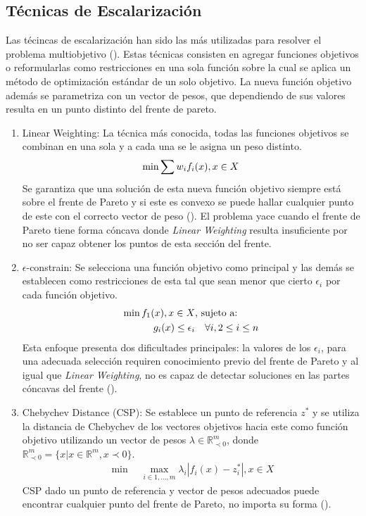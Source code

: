\subsection{T\'ecnicas de Escalarizaci\'on }

Las t\'ecincas de escalarizaci\'on han sido las m\'as utilizadas para resolver el problema multiobjetivo (\cite{miettinen2012nonlinear}). Estas t\'ecnicas consisten en agregar funciones objetivos o  reformularlas como restricciones en una sola funci\'on sobre la cual se aplica un m\'etodo de optimizaci\'on est\'andar de un solo objetivo. La nueva funci\'on objetivo adem\'as se parametriza con un vector de pesos, que dependiendo de sus valores resulta en un punto distinto del frente de pareto.
\begin{enumerate}
    \item Linear Weighting: La t\'ecnica m\'as conocida, todas las funciones objetivos se combinan en una sola y a cada una se le asigna un peso distinto.
    \begin{equation*}
        \min \sum w_i f_i(x), \space x \in X
    \end{equation*}
    Se garantiza que una soluci\'on de esta nueva funci\'on objetivo siempre est\'a sobre el frente de Pareto  y si este es convexo se puede hallar cualquier punto de este con el correcto vector de peso (\cite{emmerich2018tutorial}). El problema yace cuando el frente de Pareto tiene forma c\'oncava donde \textit{Linear Weighting} resulta insuficiente por no ser capaz obtener los puntos de esta secci\'on del frente.

    \item $\epsilon$-constrain: Se selecciona una funci\'on objetivo como principal y las dem\'as se establecen como restricciones de esta tal que sean menor que cierto $\epsilon_i$  por cada funci\'on objetivo.
    \begin{align*}
            \min  f_1(x), \space x \in X  & \text{, sujeto a:}   \\
            g_i(x) \leq \epsilon_i & \quad  \forall i, 2 \leq i \leq n
    \end{align*}
    Esta enfoque presenta dos dificultades principales: la valores de los $\epsilon_i$, para una adecuada selecci\'on requiren conocimiento previo del frente de Pareto y al igual que \textit{Linear Weighting}, no es capaz de detectar soluciones en las partes c\'oncavas del frente (\cite{emmerich2018tutorial}).

\item Chebychev Distance (CSP): Se establece un punto de referencia $z^*$ y se utiliza la distancia de Chebychev de los vectores objetivos hacia este como funci\'on objetivo utilizando un vector de pesos $\lambda \in \mathbb{R}^m_{\prec 0}$, donde $\mathbb{R}^m_{\prec 0} = \{x | x \in \mathbb{R}^m, x \prec 0 \}$. 
    \begin{align*}
        \min \quad \max_{i \in {1,...,m}} \lambda_i |f_i(x) - z^*_i|, x \in X 
    \end{align*}
    CSP dado un punto de referencia y vector de pesos adecuados puede encontrar cualquier punto del frente de Pareto, no importa su forma (\cite{emmerich2018tutorial}).
\end{enumerate}

